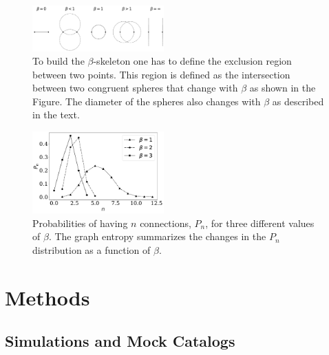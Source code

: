 \documentclass[fleqn,usenatbib]{mnras}
\newcommand{\Mpch}{\,{\rm Mpc}\,\ifmmode h^{-1}\else $h^{-1}$\fi}
\begin{document}
\begin{figure}
    \centering
    \includegraphics[width=0.45\textwidth]{betas.pdf}
   \caption{To build the $\beta$-skeleton one has to define 
     the exclusion region between two points.
     This region is defined as the
     intersection between two congruent spheres that change with
     $\beta$ as shown in the Figure.
     The diameter of the spheres also changes with $\beta$ as
     described in the text.
 \label{fig:example}}  
\end{figure} 


\begin{figure}
    \includegraphics[width=0.45\textwidth]{probabilities.pdf}
    \caption{Probabilities of having $n$ connections, $P_n$, for three different values of
    $\beta$. 
    The graph entropy summarizes the changes in the $P_n$ distribution as a function of $\beta$.}
    \label{fig:probabilities}
\end{figure}


\section{Methods}


\subsection{Simulations and Mock Catalogs}
\end{document}
